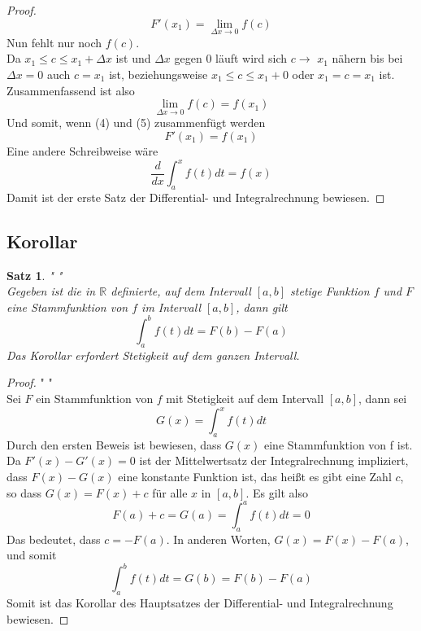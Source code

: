\documentclass[fontsize=12pt,paper=a4,DIV12,cleardoublepage=empty, 
liststotoc,idxtotoc,bibtotoc]{article}
\newcommand{\RR}{\mathbb{R}}
\theoremstyle{plain}
\newtheorem{satz}{Satz}[subsection]
\theoremstyle{definition}
\begin{document}
\begin{proof}
\begin{equation}
			F'(x_1)=\lim \limits_{\Delta x \to 0}f(c)
		\end{equation}
		Nun fehlt nur noch $f(c)$.\\ Da $x_1 \leq c \leq x_1+\Delta x$ ist und $\Delta x$ gegen $0$ läuft wird sich $c\to$ $x_1$ nähern bis bei $\Delta x=0$ auch $c = x_1$ ist, beziehungsweise $x_1 \leq c \leq x_1 + 0$ oder $x_1 = c = x_1$ ist.\\Zusammenfassend ist also
		\begin{equation}
			\lim \limits_{\Delta x \to 0} f(c) = f(x_1)
		\end{equation}
		Und somit, wenn (4) und (5) zusammenfügt werden
		\begin{equation*}
			F'(x_1)=f(x_1)
		\end{equation*}
		Eine andere Schreibweise wäre
		\begin{equation*}
			\frac{d}{dx}\int_{a}^{x}f(t)dt=f(x)
		\end{equation*}
		Damit ist der erste Satz der Differential- und Integralrechnung bewiesen.
	\end{proof}
	\newpage
	
	
	\subsection{Korollar}
	\begin{satz}" "\\
		Gegeben ist die in $\RR$ definierte, auf dem Intervall $[a, b]$ stetige Funktion $f$  und $F$ eine Stammfunktion von $f$ im Intervall $[a, b]$, dann gilt
		\begin{equation*}
			\int_{a}^{b}f(t)dt=F(b)-F(a)
		\end{equation*}
		Das Korollar erfordert Stetigkeit auf dem ganzen Intervall.
	\end{satz}

	\begin{proof}" "\\
		Sei $F$ ein Stammfunktion von $f$ mit Stetigkeit auf dem Intervall $[a, b]$, dann sei
		\begin{equation*}
			G(x)=\int_{a}^{x}f(t)dt
		\end{equation*}
		Durch den ersten Beweis ist bewiesen, dass $G(x)$ eine Stammfunktion von f ist. Da $F'(x)-G'(x)=0$ ist der Mittelwertsatz der Integralrechnung impliziert, dass $F(x)-G(x)$ eine konstante Funktion ist, das heißt es gibt eine Zahl $c$, so dass $G(x)=F(x)+c$ für alle $x$ in $[a, b]$. Es gilt also
		\begin{equation*}
			F(a)+c=G(a)=\int_{a}^{a}f(t)dt=0
		\end{equation*}
		Das bedeutet, dass $c=-F(a)$. In anderen Worten, $G(x)=F(x)-F(a)$, und somit
		\begin{equation*}
			\int_{a}^{b}f(t)dt=G(b)=F(b)-F(a)
		\end{equation*}
		Somit ist das Korollar des Hauptsatzes der Differential- und Integralrechnung bewiesen.
	\end{proof}	
	\newpage
	
\end{document}
